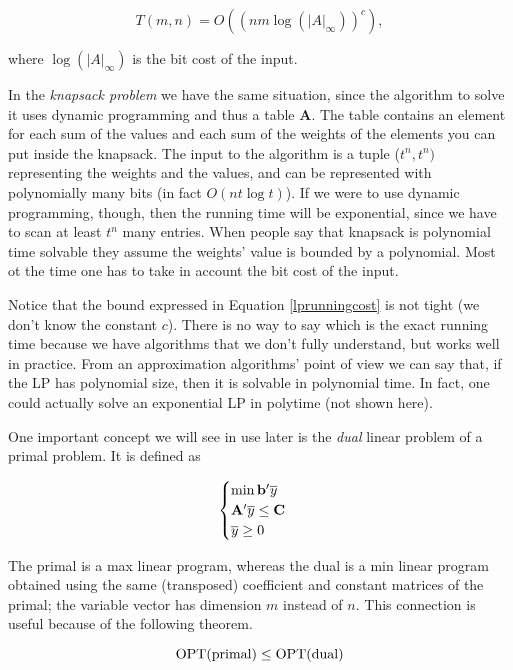 \begin{equation}\label{lprunningcost}
T(m, n) =O\left((nm\log\left(|A|_\infty\right))^c\right),
\end{equation}

where $\log\left(|A|_\infty\right)$ is the bit cost of the input.

In the \emph{knapsack problem} we have the same situation, since the algorithm to solve it uses dynamic programming and thus a table $\mathbf{A}$. The table contains an element for each sum of the values and each sum of the weights of the elements you can put inside the knapsack. The input to the algorithm is a tuple ($t^n, t^n)$ representing the weights and the values, and can be represented with polynomially many bits (in fact $O(nt\log t)$). If we were to use dynamic programming, though, then the running time will be exponential, since we have to scan at least $t^n$ many entries. When people say that knapsack is polynomial time solvable they assume the weights' value is bounded by a polynomial. Most ot the time one has to take in account the bit cost of the input.

Notice that the bound expressed in Equation \ref{lprunningcost} is not tight (we don't know the constant $c$). There is no way to say which is the exact running time because we have algorithms that we don't fully understand, but works well in practice. From an approximation algorithms' point of view we can say that, if the LP has polynomial size, then it is solvable in polynomial time. In fact, one could actually solve an exponential LP in polytime (not shown here).

One important concept we will see in use later is the \emph{dual} linear problem of a primal problem. It is defined as

\begin{equation}\label{lp:dualform}
\begin{cases}
\min \mathbf{b}'\overline{y}\\
\mathbf{A}'\overline{y} \leq \mathbf{C}\\
\overline{y} \geq 0
\end{cases}
\end{equation}

The primal is a max linear program, whereas the dual is a min linear program obtained using the same (transposed) coefficient and constant matrices of the primal; the variable vector has dimension $m$ instead of $n$. This connection is useful because of the following theorem.

\begin{thm}
\begin{equation}
    \text{OPT}(\text{primal}) \leq  \text{OPT}(\text{dual})
\end{equation}
\end{thm}


